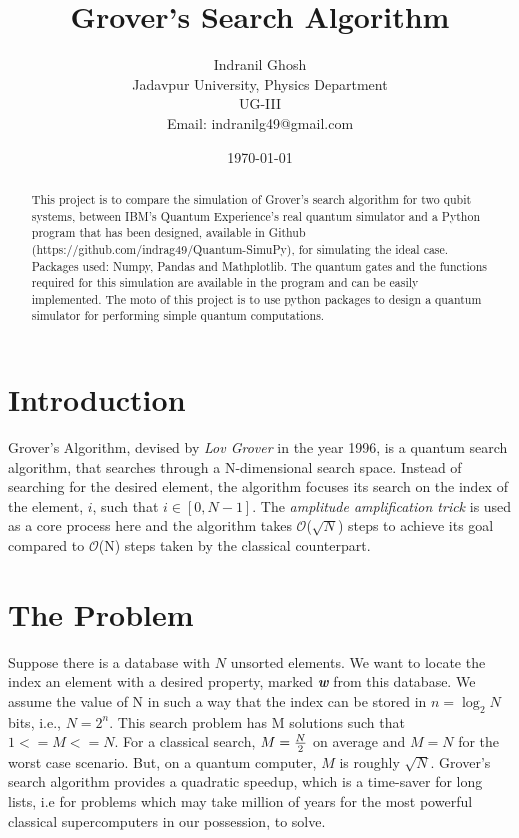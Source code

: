 \documentclass{article}
\title{\textbf{Grover's Search Algorithm}}
\author{Indranil Ghosh\\Jadavpur University, Physics Department\\ UG-III\\ Email: indranilg49@gmail.com}
\date{\today}
\begin{document}
\maketitle

\begin{abstract}
This project is to compare the simulation of Grover's search algorithm for two qubit systems, between IBM's Quantum Experience's real quantum simulator and a  Python program that  has been designed, available in Github (https://github.com/indrag49/Quantum-SimuPy), for  simulating the ideal case. Packages used: Numpy, Pandas and Mathplotlib. The quantum gates and the functions required for this simulation are available in the program and can be easily implemented. The moto of this project is to use python packages to design a quantum simulator for performing simple quantum computations.
\end{abstract}

\section{Introduction}
Grover's Algorithm, devised by \textit{Lov Grover} in the year 1996, is a quantum search algorithm, that searches through a N-dimensional search space. Instead of searching for the desired element, the algorithm focuses its search on the index of the element, $i$, such that $i \in[0, N-1]$. The \textit{amplitude amplification trick} is used as a core process here and the algorithm takes $\mathcal{O}$($\sqrt{N}$) steps to achieve its goal compared to  $\mathcal{O}$(N) steps taken by the classical counterpart.

\section{The Problem}
Suppose there is a database with $N$ unsorted elements. We want to locate the index an element with a desired property, marked \textit{\textbf{w}} from this database. We assume the value of N in such a way that the index can be stored in $n=\log_2{N}$ bits, i.e., $N=2^n$. This search problem has M solutions such that $1<=M<=N$. For a classical search, $M={N \over 2}$ on average and $M=N$ for the worst case scenario. But, on a quantum computer, $M$ is roughly $\sqrt{N}$. Grover's search algorithm provides a quadratic speedup, which is  a time-saver for long lists, i.e for problems which may take million of years for the most powerful classical supercomputers in our possession, to solve.
\end{document}
